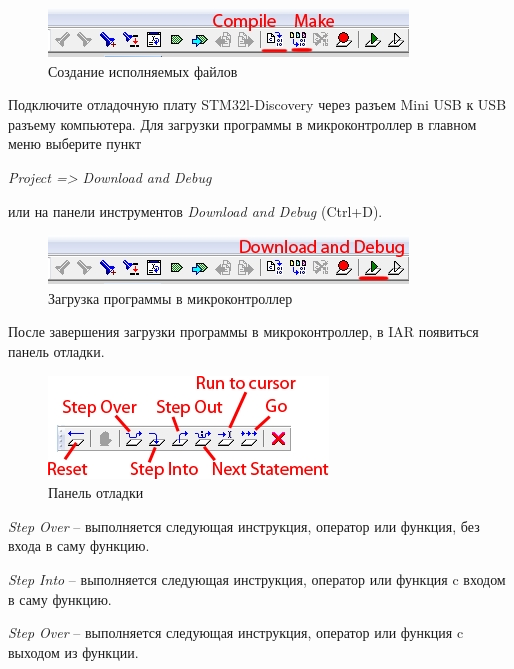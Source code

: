 \begin{figure}[h!]
\begin{center}
\includegraphics[scale=0.7]{Image/20.jpg}
\end{center}
\caption{Создание исполняемых файлов}
\end{figure}

Подключите отладочную плату STM32l-Discovery через разъем Mini USB к USB разъему компьютера. Для загрузки программы в микроконтроллер в главном меню выберите пункт 
\begin{center}
\textit{Project => Download and Debug}
\end{center}
или на панели инструментов \textit{Download and Debug} (Ctrl+D). 

 
\begin{figure}[h!]
\begin{center}
\includegraphics[scale=0.7]{Image/21.jpg}
\end{center}
\caption{Загрузка программы в микроконтроллер}
\end{figure}

После завершения загрузки программы в микроконтроллер, в IAR появиться панель отладки. 
\begin{figure}[h!]
\begin{center}
\includegraphics[scale=0.7]{Image/22.jpg}
\end{center}
\caption{Панель отладки}
\end{figure}

\textit{Step Over } -- выполняется следующая инструкция, оператор или функция, без входа в саму функцию.

\textit{Step Into } -- выполняется следующая инструкция, оператор или функция c входом в саму функцию.

\textit{Step Over } -- выполняется следующая инструкция, оператор или функция c выходом из функции.


